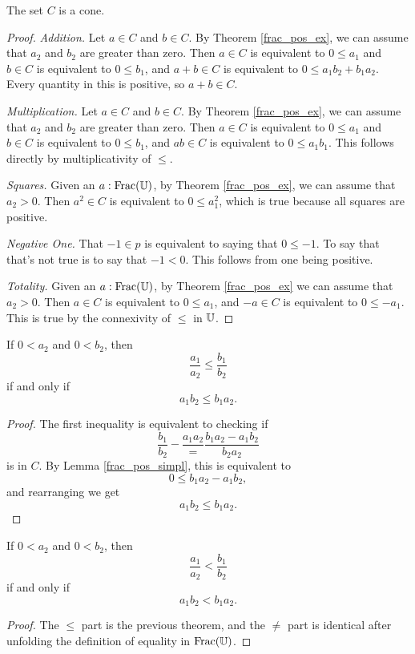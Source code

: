 \documentclass[../../math.tex]{subfiles}
\begin{document}
\begin{instance}
    The set $C$ is a cone.
\end{instance}
\begin{proof}
    \textit{Addition.} Let $a \in C$ and $b \in C$.  By Theorem
    \ref{frac_pos_ex}, we can assume that $a_2$ and $b_2$ are greater than zero.
    Then $a \in C$ is equivalent to $0 \leq a_1$ and $b \in C$ is equivalent to
    $0 \leq b_1$, and $a + b \in C$ is equivalent to $0 \leq a_1b_2 + b_1a_2$.
    Every quantity in this is positive, so $a + b \in C$.

    \textit{Multiplication.} Let $a \in C$ and $b \in C$.  By Theorem
    \ref{frac_pos_ex}, we can assume that $a_2$ and $b_2$ are greater than zero.
    Then $a \in C$ is equivalent to $0 \leq a_1$ and $b \in C$ is equivalent to
    $0 \leq b_1$, and $ab \in C$ is equivalent to $0 \leq a_1b_1$.  This follows
    directly by multiplicativity of $\leq$.

    \textit{Squares.} Given an $a : \operatorname{Frac}(\mathbb{U})$, by Theorem \ref{frac_pos_ex}, we
    can assume that $a_2 > 0$.  Then $a^2 \in C$ is equivalent to $0 \leq
    a_1^2$, which is true because all squares are positive.

    \textit{Negative One.} That $-1 \in p$ is equivalent to saying that $0 \leq
    -1$.  To say that that's not true is to say that $-1 < 0$.  This follows
    from one being positive.

    \textit{Totality.} Given an $a : \operatorname{Frac}(\mathbb{U})$, by Theorem \ref{frac_pos_ex} we
    can assume that $a_2 > 0$.  Then $a \in C$ is equivalent to $0 \leq a_1$,
    and $-a \in C$ is equivalent to $0 \leq -a_1$.  This is true by the
    connexivity of $\leq$ in $\mathbb{U}$.
\end{proof}

\begin{theorem} \label{frac_le}
    If $0 < a_2$ and $0 < b_2$, then
    \[
        \frac{a_1}{a_2} \leq \frac{b_1}{b_2}
    \]
    if and only if
    \[
        a_1b_2 \leq b_1a_2.
    \]
\end{theorem}
\begin{proof}
    The first inequality is equivalent to checking if
    \[
        \frac{b_1}{b_2} - \frac{a_1a_2}
        = \frac{b_1a_2 - a_1b_2}{b_2a_2}
    \]
    is in $C$.  By Lemma \ref{frac_pos_simpl}, this is equivalent to
    \[
        0 \leq b_1a_2 - a_1b_2,
    \]
    and rearranging we get
    \[
        a_1b_2 \leq b_1a_2.
    \]
\end{proof}

\begin{theorem} \label{frac_lt}
    If $0 < a_2$ and $0 < b_2$, then
    \[
        \frac{a_1}{a_2} < \frac{b_1}{b_2}
    \]
    if and only if
    \[
        a_1b_2 < b_1a_2.
    \]
\end{theorem}
\begin{proof}
    The $\leq$ part is the previous theorem, and the $\neq$ part is identical
    after unfolding the definition of equality in $\operatorname{Frac}(\mathbb{U})$.
\end{proof}
\end{document}
